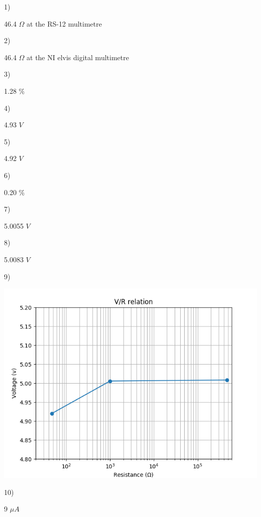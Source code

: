 \documentclass{../../myassignment}
\newcommand{\ohm}{$\Omega$ }
\newcommand{\volt}{$V$ }
\newcommand{\amperes}{$A$ }
\newcommand{\percent}{$\%$}
\newcommand{\micro}{$\mu$}
\begin{document}
	1)
	\begin{answer}
		46.4 \ohm at the RS-12 multimetre
	\end{answer}

	2)
	\begin{answer}
		46.4 \ohm at the NI elvis digital multimetre
	\end{answer}

	3)
	\begin{answer}
		1.28 \percent
	\end{answer}

	4)
	\begin{answer}
		4.93 \volt
	\end{answer}

	5)
	\begin{answer}
		4.92 \volt	
	\end{answer}

	6)
	\begin{answer}
		0.20 \percent
	\end{answer}

	7)
	\begin{answer}
		5.0055 \volt
	\end{answer}

	8)
	\begin{answer}
		5.0083 \volt
	\end{answer}

	9)

	\begin{answer}
		\includegraphics[scale=0.9]{relvoltohm.png}
	\end{answer}

	10)
	\begin{answer}
		9 \micro\amperes
	\end{answer}
\end{document}
